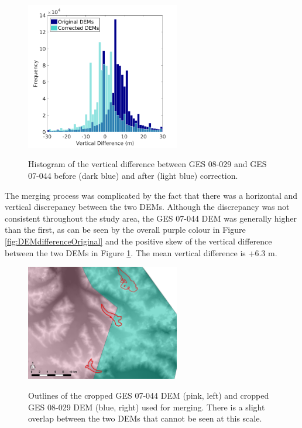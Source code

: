 \documentclass{sfuthesis}
\begin{document}
\begin{figure}
	\centering
	\includegraphics[width = 0.6\textwidth]{DEMcorrection_hist.png}\\
	\caption{Histogram of the vertical difference between GES 08-029 and GES 07-044 before (dark blue) and after (light blue) correction. }
	\label{fig:DEMcorrection_hist}
\end{figure}    
    
    
   

The merging process was complicated by the fact that there was a horizontal and vertical discrepancy between the two DEMs. Although the discrepancy was not consistent throughout the study area, the GES 07-044 DEM was generally higher than the first, as can be seen by the overall purple colour in Figure \ref{fig:DEMdifferenceOriginal} and the positive skew of the vertical difference between the two DEMs in Figure \ref{fig:DEMcorrection_hist}. The mean vertical difference is +6.3 m.


\begin{figure}
	\centering
	\includegraphics[width = 0.6\textwidth]{mergeLine.jpeg}\\
	\caption{Outlines of the cropped GES 07-044 DEM (pink, left) and cropped GES 08-029 DEM (blue, right) used for merging. There is a slight overlap between the two DEMs that cannot be seen at this scale.}
	\label{fig:mergeLine}
\end{figure}
\end{document}
